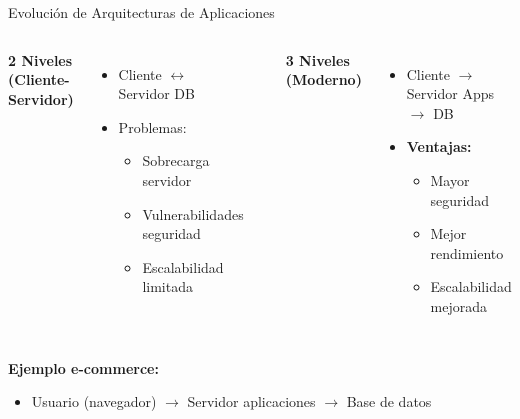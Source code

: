 \documentclass{beamer}
\begin{document}
\begin{frame}{Evolución de Arquitecturas de Aplicaciones}
\begin{columns}[T]
\textbf{2 Niveles (Cliente-Servidor)}
\begin{itemize}
    \item Cliente $\leftrightarrow$ Servidor DB
    \item \alert{Problemas:}
    \begin{itemize}
        \item Sobrecarga servidor
        \item Vulnerabilidades seguridad
        \item Escalabilidad limitada
    \end{itemize}
\end{itemize}

\begin{center}
\end{center}

\textbf{3 Niveles (Moderno)}
\begin{itemize}
    \item Cliente $\rightarrow$ Servidor Apps $\rightarrow$ DB
    \item \textbf{Ventajas:}
    \begin{itemize}
        \item Mayor seguridad
        \item Mejor rendimiento
        \item Escalabilidad mejorada
    \end{itemize}
\end{itemize}

\begin{center}
\end{center}
\end{columns}

\textbf{Ejemplo e-commerce:}
\begin{itemize}
    \item Usuario (navegador) $\rightarrow$ Servidor aplicaciones $\rightarrow$ Base de datos
\end{itemize}
\end{frame}
\end{document}
